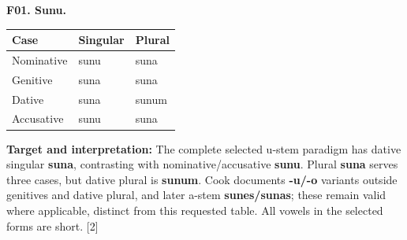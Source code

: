 \par\begin{minipage}{\linewidth}\raggedright
\textbf{F01. Sunu.}

\par\begingroup
\fontsize{10.5}{13.2}\selectfont
\setlength{\LTleft}{0pt}\setlength{\LTright}{\fill}
\noindent
\begin{tabular}{@{}>{\raggedright\arraybackslash}p{39.46mm}>{\raggedright\arraybackslash}p{39.46mm}>{\raggedright\arraybackslash}p{39.46mm}@{}}
\toprule
\textbf{Case} & \textbf{Singular} & \textbf{Plural} \\
\midrule
Nominative & sunu & suna \\
Genitive & suna & suna \\
Dative & suna & sunum \\
Accusative & sunu & suna \\
\bottomrule
\end{tabular}
\par\endgroup

\textbf{Target and interpretation:} The complete selected u-stem paradigm has dative singular \textbf{suna}, contrasting with nominative/\allowbreak{}accusative \textbf{sunu}. Plural \textbf{suna} serves three cases, but dative plural is \textbf{sunum}. Cook documents \textbf{-u/\allowbreak{}-o} variants outside genitives and dative plural, and later a-stem \textbf{sunes/\allowbreak{}sunas}; these remain valid where applicable, distinct from this requested table. All vowels in the selected forms are short. [2]

\end{minipage}\par\addvspace{4pt}

